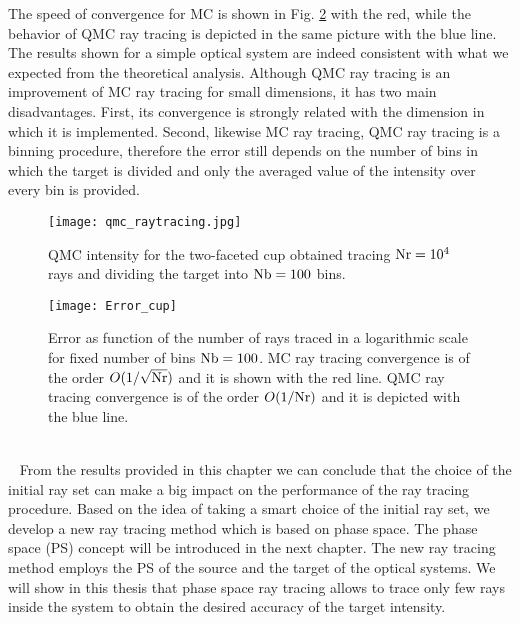 The speed of convergence for MC is shown in Fig. \ref{fig:Error_cup} with the red, while the behavior of QMC ray tracing is depicted in the same picture with the blue line.
The results shown for a simple optical system are indeed consistent with what we expected from the theoretical analysis.
Although QMC ray tracing is an improvement of MC ray tracing for small dimensions, it has two main disadvantages. 
First, its convergence is strongly related with the dimension in which it is implemented.
Second, likewise MC ray tracing, QMC ray tracing is a binning procedure, therefore the error still depends on the number of bins in which the target is divided and only the averaged value of the intensity over every bin is provided.
\begin{figure}[h]
\begin{center}
    \texttt{[image: qmc\_raytracing.jpg]}
    \caption{QMC intensity for the two-faceted cup obtained tracing $\textrm{Nr}=10^4$ rays and dividing the target into $\textrm{Nb}=100$ bins.}
    \label{fig:qmc_intensity}
\end{center}
  \end{figure}
\begin{figure}[h]
\begin{center}
    \texttt{[image: Error\_cup]}
    \caption{Error as function of the number of rays traced in a logarithmic scale for fixed number of bins $\textrm{Nb}=100$.
 MC ray tracing convergence is of the order $O(1/\sqrt{\textrm{Nr}})$ and it is shown with the red line. 
QMC ray tracing convergence is of the order $O(1/\textrm{Nr})$ and it is depicted with the blue line.}
    \label{fig:Error_cup}
\end{center}
  \end{figure}
 \\\ \indent
From the results provided in this chapter we can conclude that the choice of the initial ray set can make a big impact on the performance of the ray tracing procedure. 
Based on the idea of taking a smart choice of the initial ray set, we develop a new ray tracing method which is based on phase space. 
The phase space (PS) concept will be introduced in the next chapter. The new ray tracing method employs the PS of the source and the target of the optical systems.
We will show in this thesis that phase space ray tracing allows to trace only few rays inside the system to obtain the desired accuracy of the target intensity. 





















